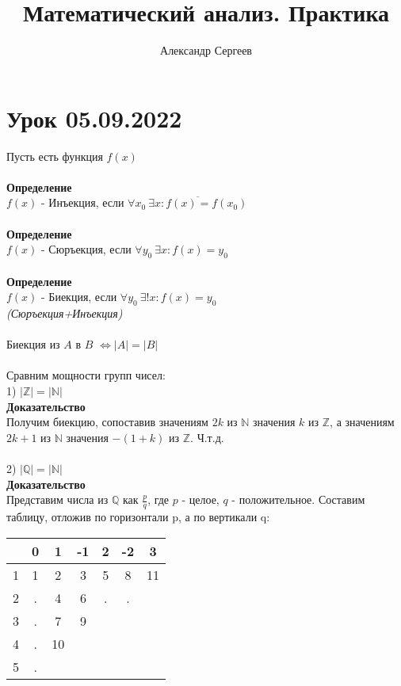 \documentclass[12pt]{article}
\title{Математический анализ. Практика}
\author{Александр Сергеев}
\date{}
\begin{document}
\maketitle
\section{Урок 05.09.2022}
Пусть есть функция $f(x)$\\\\
\textbf{Определение}\\
$f(x)$ - Инъекция, если $\forall x_0\ \overline{\exists x: f(x)=f(x_0)}$\\\\
\textbf{Определение}\\
$f(x)$ - Сюръекция, если $\forall y_0\ \exists x: f(x)=y_0$\\\\
\textbf{Определение}\\
$f(x)$ - Биекция, если $\forall y_0\ \exists! x: f(x)=y_0$\\\textit{(Сюръекция+Инъекция)}\\\\
Биекция из $A$ в $B$ $\Leftrightarrow |A| = |B|$\\\\
Сравним мощности групп чисел:\\
1) $|\mathbb{Z}| = |\mathbb{N}|$\\
\textbf{Доказательство}\\
Получим биекцию, сопоставив значениям $2k$ из $\mathbb{N}$ значения $k$ из $\mathbb{Z}$, а значениям $2k+1$ из $\mathbb{N}$ значения $-(1+k)$ из $\mathbb{Z}$. Ч.т.д.\\\\
2) $|\mathbb{Q}| = |\mathbb{N}|$\\
\textbf{Доказательство}\\
Представим числа из $\mathbb{Q}$ как $\frac{p}{q}$, где $p$ - целое, $q$ - положительное.
Составим таблицу, отложив по горизонтали p, а по вертикали q:\\
\begin{center}
\begin{tabular}{ |c|c c c c c c| } 
 \hline
   & 0 & 1 & -1 & 2 & -2 & 3\\
   \hline
 1 & 1 & 2 & 3 & 5 & 8 & 11 \\ 
 2 & . & 4 & 6 & . & . & \\ 
 3 & . & 7 & 9 & & & \\ 
 4 & . & 10 & & & & \\ 
 5 & . &  & & & & \\ 
 \hline
\end{tabular}
\end{center}
\end{document}
